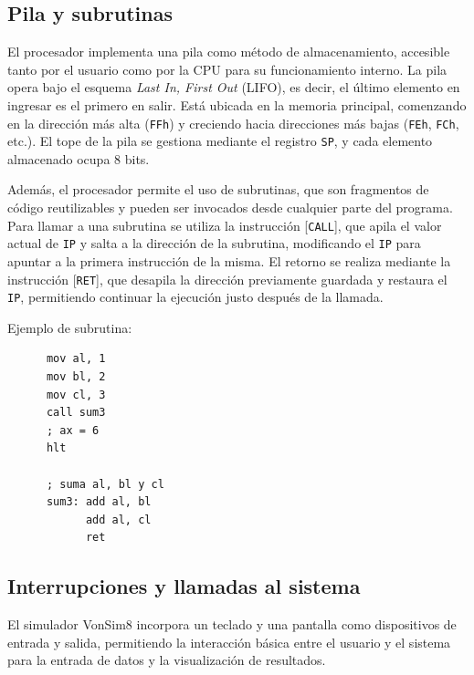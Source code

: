 \documentclass[12pt,oneside]{templates/unerthesis}
\begin{document}
\hypertarget{pila-y-subrutinas}{%
\subsection{Pila y subrutinas}\label{pila-y-subrutinas}}

El procesador implementa una pila como método de almacenamiento, accesible tanto por el usuario como por la CPU para su funcionamiento interno. La pila opera bajo el esquema \emph{Last In, First Out} (LIFO), es decir, el último elemento en ingresar es el primero en salir. Está ubicada en la memoria principal, comenzando en la dirección más alta (\texttt{FFh}) y creciendo hacia direcciones más bajas (\texttt{FEh}, \texttt{FCh}, etc.). El tope de la pila se gestiona mediante el registro \texttt{SP}, y cada elemento almacenado ocupa 8 bits.

Además, el procesador permite el uso de subrutinas, que son fragmentos de código reutilizables y pueden ser invocados desde cualquier parte del programa. Para llamar a una subrutina se utiliza la instrucción {[}\texttt{CALL}{]}, que apila el valor actual de \texttt{IP} y salta a la dirección de la subrutina, modificando el \texttt{IP} para apuntar a la primera instrucción de la misma. El retorno se realiza mediante la instrucción {[}\texttt{RET}{]}, que desapila la dirección previamente guardada y restaura el \texttt{IP}, permitiendo continuar la ejecución justo después de la llamada.

Ejemplo de subrutina:

\begin{lstlisting}
      mov al, 1
      mov bl, 2
      mov cl, 3
      call sum3
      ; ax = 6
      hlt

      ; suma al, bl y cl
      sum3: add al, bl
            add al, cl
            ret\end{lstlisting}

\hypertarget{interrupciones-y-llamadas-al-sistema}{%
\subsection{Interrupciones y llamadas al sistema}\label{interrupciones-y-llamadas-al-sistema}}

El simulador VonSim8 incorpora un teclado y una pantalla como dispositivos de entrada y salida, permitiendo la interacción básica entre el usuario y el sistema para la entrada de datos y la visualización de resultados.
\end{document}
